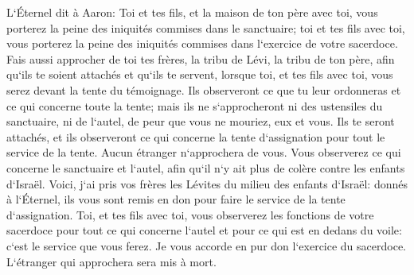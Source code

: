 \verse L`Éternel dit à Aaron: Toi et tes fils, et la maison de ton père avec toi, vous porterez la peine des iniquités commises dans le sanctuaire; toi et tes fils avec toi, vous porterez la peine des iniquités commises dans l`exercice de votre sacerdoce. 
\verse Fais aussi approcher de toi tes frères, la tribu de Lévi, la tribu de ton père, afin qu`ils te soient attachés et qu`ils te servent, lorsque toi, et tes fils avec toi, vous serez devant la tente du témoignage. 
\verse Ils observeront ce que tu leur ordonneras et ce qui concerne toute la tente; mais ils ne s`approcheront ni des ustensiles du sanctuaire, ni de l`autel, de peur que vous ne mouriez, eux et vous. 
\verse Ils te seront attachés, et ils observeront ce qui concerne la tente d`assignation pour tout le service de la tente. Aucun étranger n`approchera de vous. 
\verse Vous observerez ce qui concerne le sanctuaire et l`autel, afin qu`il n`y ait plus de colère contre les enfants d`Israël. 
\verse Voici, j`ai pris vos frères les Lévites du milieu des enfants d`Israël: donnés à l`Éternel, ils vous sont remis en don pour faire le service de la tente d`assignation. 
\verse Toi, et tes fils avec toi, vous observerez les fonctions de votre sacerdoce pour tout ce qui concerne l`autel et pour ce qui est en dedans du voile: c`est le service que vous ferez. Je vous accorde en pur don l`exercice du sacerdoce. L`étranger qui approchera sera mis à mort. 
